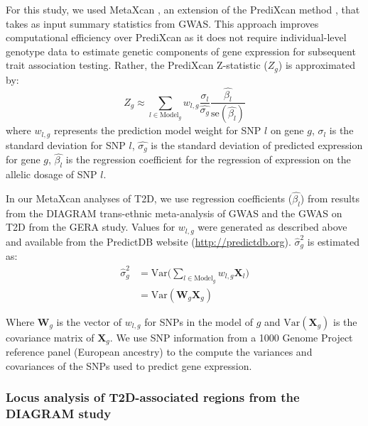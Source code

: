 \documentclass[10pt]{article}
\begin{document}
For this study, we used MetaXcan \cite{Barbeira2016}, an extension of the PrediXcan method \cite{Gamazon2015}, that takes as input summary statistics from GWAS. This approach improves computational efficiency over PrediXcan as it does not require individual-level genotype data to estimate genetic components of gene expression for subsequent trait association testing. Rather, the PrediXcan Z-statistic ($Z_{g}$) is approximated by:
\begin{equation}
Z_{g} \approx \sum_{l \in \mathrm{Model}_{g}} w_{l,g} \dfrac{\sigma_{l}}{\hat{\sigma_{g}}} \dfrac{\hat{\beta_{l}}}{\mathrm{se}(\hat{\beta_{l}})}
\end{equation}
where $w_{l,g}$ represents the prediction model weight for SNP $l$ on gene $g$, $\sigma_{l}$ is the standard deviation for SNP $l$, $\hat{\sigma_{g}}$ is the standard deviation of predicted expression for gene $g$, $\hat{\beta_{l}}$ is the regression coefficient for the regression of expression on the allelic dosage of SNP $l$. 

In our MetaXcan analyses of T2D, we use regression coefficients ($\hat{\beta_{l}}$) from results from the DIAGRAM trans-ethnic meta-analysis of GWAS and the GWAS on T2D from the GERA study. Values for $w_{l,g}$ were generated as described above and available from the PredictDB website (\url{http://predictdb.org}). $\hat{\sigma}^{2}_{g}$ is estimated as:
\begin{equation}
\begin{split}
\hat{\sigma}^{2}_{g} &= \mathrm{Var}\Bigg(\sum_{l\in\mathrm{Model}_{g}} w_{l,g}\bm{X}_{l}\Bigg) \\
&= \mathrm{Var}(\mathbf{W}_{g}\mathbf{X}_{g})
\end{split}
\end{equation}

Where $\mathbf{W}_{g}$ is the vector of $w_{l,g}$ for SNPs in the model of $g$ and $\mathrm{Var}(\mathbf{X}_{g})$ is the covariance matrix of $\mathbf{X}_{g}$. We use SNP information from a 1000 Genome Project reference panel (European ancestry) to the compute the variances and covariances of the SNPs used to  predict gene expression. 


\subsubsection*{Locus analysis of T2D-associated regions from the DIAGRAM study}
\end{document}
